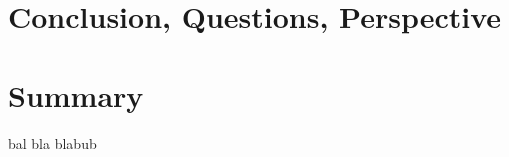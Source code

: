 \section{Conclusion, Questions, Perspective} %
\label{sec:conclusion_questions_perspective}




\section{Summary} %
\label{sec:summary}
bal bla blabub
